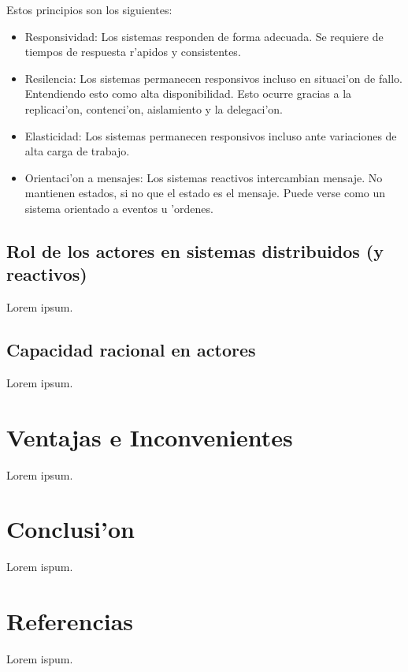 \documentclass[12pt]{article}
\begin{document}
Estos principios son los siguientes:

\begin{itemize}
	\item Responsividad: Los sistemas responden de forma adecuada. Se requiere de tiempos
    de respuesta r'apidos y consistentes.
	\item Resilencia: Los sistemas permanecen responsivos incluso en situaci'on de fallo.
    Entendiendo esto como alta disponibilidad. Esto ocurre gracias a la replicaci'on, contenci'on,
    aislamiento y la delegaci'on.
	\item Elasticidad: Los sistemas permanecen responsivos incluso ante variaciones de alta
    carga de trabajo.
	\item Orientaci'on a mensajes: Los sistemas reactivos intercambian mensaje. No mantienen estados,
    si no que el estado es el mensaje. Puede verse como un sistema orientado a eventos u 'ordenes.
\end{itemize}

\subsection{Rol de los actores en sistemas distribuidos (y reactivos)}
\label{sub:rol de los actores en sistemas distribuidos y reactivos}
Lorem ipsum.
\subsection{Capacidad racional en actores}
\label{sub:capacidad racional en actores}
Lorem ipsum.
\section{Ventajas e Inconvenientes}
\label{sec:ventajas e inconvenientes}
Lorem ipsum.
\section{Conclusi'on}
Lorem ispum.
\section{Referencias}
Lorem ispum.
\end{document}
